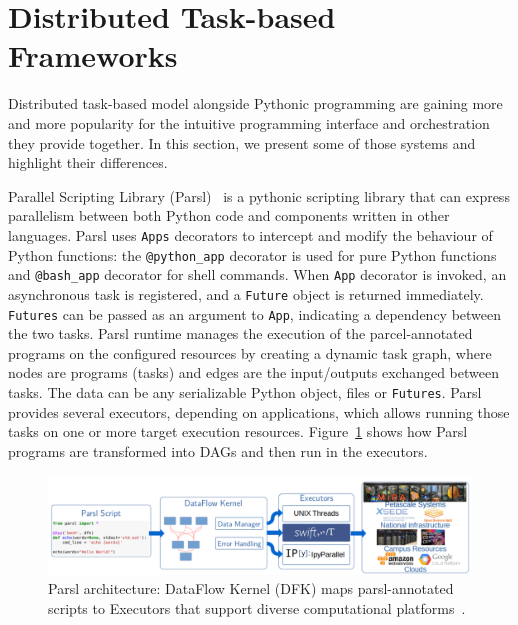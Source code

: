 

\section{Distributed Task-based Frameworks}\label{sec:task-based-frameworks}

Distributed task-based model alongside Pythonic programming are gaining more and more popularity for the intuitive programming interface and orchestration they provide together. In this section, we present some of those systems and highlight their differences.  

Parallel Scripting Library (Parsl)~\cite{babuji2017introducing, babuji2018parsl, babuji_parsl_2019} is a pythonic scripting library that can express parallelism between both Python code and components written in other languages. Parsl uses \texttt{Apps} decorators to intercept and modify the behaviour of Python functions: the \texttt{@python\_app} decorator is used for pure Python functions and \texttt{@bash\_app} decorator for shell commands. When \texttt{App} decorator is invoked, an asynchronous task is registered, and a \texttt{Future} object is returned immediately. \texttt{Futures} can be passed as an argument to \texttt{App}, indicating a dependency between the two tasks. 
Parsl runtime manages the execution of the parcel-annotated programs on the configured resources by creating a dynamic task graph, where nodes are programs (tasks) and edges are the input/outputs exchanged between tasks. The data can be any serializable Python object, files or \texttt{Futures}. 
 Parsl provides several executors, depending on applications, which allows running those tasks on one or more target execution resources. Figure~\ref{figparsl} shows how Parsl programs are transformed into DAGs and then run in the executors.  

\begin{figure}[tb]\centering
\includegraphics[scale=0.44]{figures/parsl.png}
\caption{Parsl architecture: DataFlow Kernel (DFK) maps parsl-annotated scripts to Executors that support diverse computational platforms~\cite{babuji2018parsl}.}
\label{figparsl}
\end{figure}


